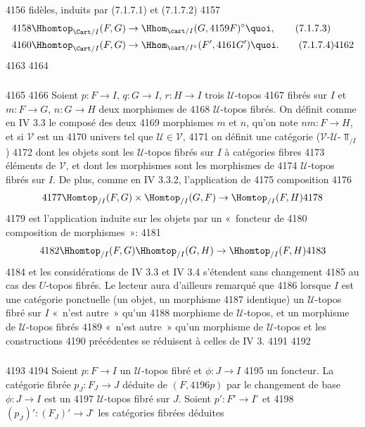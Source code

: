   4156	fidèles, induits par (7.1.7.1) et (7.1.7.2)
  4157	\begin{align*}
  4158	\Hhomtop_{\Cart/I} (F, G) & \to \Hhom_{\cart /I} (G,
  4159	  F)^{\circ}{\quoi},\tag{7.1.7.3}\\
  4160	\Hhomtop_{\Cart/I} (F, G) &\to \Hhom_{\cart /I^{\circ}} (F',
  4161	  G'){\quoi}.\tag{7.1.7.4}
  4162	\end{align*}
  4163	
  4164	\subsubsection{}
  4165	
  4166	Soient $p : F \to I$, $q : G \to I$, $r : H \to I$ trois $𝒰$-topos
  4167	fibrés sur $I$ et $m : F \to G$, $n : G \to H$ deux morphismes de
  4168	$𝒰$-topos fibrés. On définit comme en IV 3.3 le composé des deux
  4169	morphismes $m$ et $n$, qu'on note $nm : F \to H$, et si $𝒱$ est un
  4170	univers tel que $𝒰 \in 𝒱$,
  4171	on définit une catégorie ($𝒱$-$𝒰$-$\Top_{/I}$)
  4172	dont les objets sont les $𝒰$-topos fibrés sur $I$ à catégories fibres
  4173	éléments de $𝒱$, et dont les morphismes sont les morphismes de
  4174	$𝒰$-topos fibrés sur $I$. De plus, comme en IV 3.3.2, l'application de
  4175	composition
  4176	$$
  4177	\Homtop_{/I} (F, G) \times \Homtop_{/I} (G, F) \to \Homtop_{/I} (F, H)
  4178	$$
  4179	est l'application induite sur les objets par un « foncteur de
  4180	composition de morphismes »:
  4181	$$
  4182	\Hhomtop_{/I} (F, G) \Hhomtop_{/I} (G, H) \to \Hhomtop_{/I} (F, H)
  4183	$$
  4184	et les considérations de IV 3.3 et IV 3.4 s'étendent sans changement
  4185	au cas des $U$-topos fibrés. Le lecteur aura d'ailleurs remarqué que
  4186	lorsque $I$ est une catégorie ponctuelle (un objet, un morphisme
  4187	identique) un $𝒰$-topos fibré sur $I$ « n'est autre » qu'un
  4188	morphisme de $𝒰$-topos, et un morphisme de $𝒰$-topos fibrés
  4189	« n'est autre » qu'un morphisme de $𝒰$-topos et les constructions
  4190	précédentes se réduisent à celles de IV 3.
  4191	
  4192	\subsubsection{}
  4193	
  4194	Soient $p : F \to I$ un $𝒰$-topos fibré et $\phi : J \to I$
  4195	un foncteur. La catégorie fibrée $p_J : F_J \to J$ déduite de $(F,
  4196	p)$ par le changement de base $\phi : J \to I$ est un
  4197	$𝒰$-topos fibré sur $J$. Soient $p': F'\to I^{\circ}$ et
  4198	$(p_J)': (F_J)'\to J^{\circ}$ les catégories fibrées déduites

